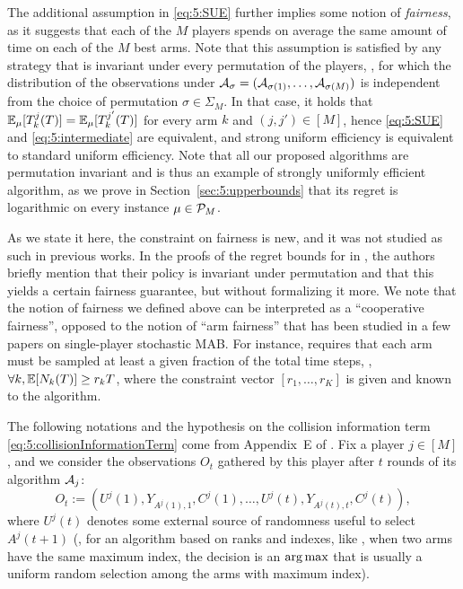 The additional assumption in \eqref{eq:5:SUE} further implies some notion of \emph{fairness}, as it suggests that each of the $M$ players spends on average the same amount of time on each of the $M$ best arms. Note that this assumption is satisfied by any strategy that is invariant under every permutation of the players, \ie, for which the distribution of the observations under $\mathcal{A}_{\sigma} = (\mathcal{A}_{\sigma(1)},\dots,\mathcal{A}_{\sigma(M)})$ is independent from the choice of permutation $\sigma \in \Sigma_M$. In that case, it holds that  $\mathbb{E}_{\mu}[T_k^j(T)]=\mathbb{E}_{\mu}[T_k^{j'}(T)]$ for every arm $k$ and $(j,j') \in [M]$, hence \eqref{eq:5:SUE} and \eqref{eq:5:intermediate} are equivalent, and strong uniform efficiency is equivalent to standard uniform efficiency. Note that all our proposed algorithms are permutation invariant and \MCTopM{} is thus an example of strongly uniformly efficient algorithm, as we prove in Section~\ref{sec:5:upperbounds} that its regret is logarithmic on every instance $\mu \in \mathcal{P}_M$.

As we state it here, the constraint on fairness is new, and it was not studied as such in previous works.
In the proofs of the regret bounds for \rhoRand{} in \cite{Anandkumar11}, the authors briefly mention that their policy is invariant under permutation and that this yields a certain fairness guarantee, but without formalizing it more.
We note that the notion of fairness we defined above can be interpreted as a ``cooperative fairness'', opposed to the notion of ``arm fairness'' that has been studied in a few papers on single-player stochastic MAB.
For instance, \cite{Patil2019stochastic} requires that each arm must be sampled at least a given fraction of the total time steps, \ie, $\forall k, \mathbb{E}[N_k(T)] \geq r_k T$, where the constraint vector $[r_1,\dots,r_K]$ is given and known to the algorithm.


The following notations and the hypothesis on the collision information term \eqref{eq:5:collisionInformationTerm} come from Appendix~E of \cite{KaufmannAbbas19}.
Fix a player $j\in[M]$, and we consider the observations $O_t$ gathered by this player after $t$ rounds of its algorithm $\mathcal{A}_j$:
\[ O_t := \left( U^j(1), Y_{A^j(1),1}, C^j(1), \ldots, U^j(t), Y_{A^j(t),t}, C^j(t) \right),\]
where $U^j(t)$ denotes some external source of randomness useful to select $A^j(t+1)$ (\eg, for an algorithm based on ranks and \UCB{} indexes, like \RhoRand, when two arms have the same maximum index, the decision is an $\operatorname*{arg\,max}$ that is usually a uniform random selection among the arms with maximum index).

